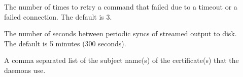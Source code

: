 \begin{description}
\item[]
\label{param:GridmanagerConnectFailureRetryCount} The number of times
to retry a command that failed due to a timeout or a failed connection.
The default is 3.

\item[]
\label{param:GridmanagerSyncJobIoInterval} The number of seconds between
periodic syncs of streamed output to disk. The default is 5 minutes
(300 seconds).



\item[]
\label{param:GSIDaemonName} A comma separated list of the subject
name(s) of the certificate(s) that the daemons use.
\end{description}


